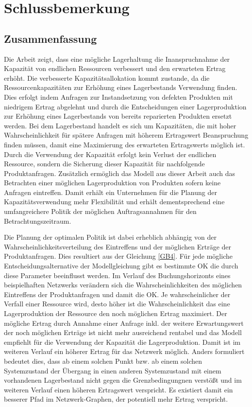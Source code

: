\chapter{Schlussbemerkung}
\setcounter{footnote}{9}

\section*{Zusammenfassung}

Die Arbeit zeigt, dass eine mögliche Lagerhaltung die Inanspruchnahme der Kapazität von endlichen Ressourcen verbessert und den erwarteten Ertrag erhöht. Die verbesserte Kapazitätsallokation kommt zustande, da die Ressourcenkapazitäten zur Erhöhung eines Lagerbestands Verwendung finden. Dies erfolgt indem Anfragen zur Instandsetzung von defekten Produkten mit niedrigem Ertrag abgelehnt und durch die Entscheidungen einer Lagerproduktion zur Erhöhung eines Lagerbestands von bereits reparierten Produkten ersetzt werden. Bei dem Lagerbestand handelt es sich um Kapazitäten, die mit hoher Wahrscheinlichkeit für spätere Anfragen mit höherem Ertragswert Beanspruchung finden müssen, damit eine Maximierung des erwarteten Ertragswerts möglich ist. Durch die Verwendung der Kapazität erfolgt kein Verlust der endlichen Ressource, sondern die Sicherung dieser Kapazität für nachfolgende Produktanfragen. Zusätzlich ermöglich das Modell aus dieser Arbeit auch das Betrachten einer möglichen Lagerproduktion von Produkten sofern keine Anfragen eintreffen. Damit erhält ein Unternehmen für die Planung der Kapazitätsverwendung mehr Flexibilität und erhält dementsprechend eine umfangreichere Politik der möglichen Auftragsannahmen für den Betrachtungszeitraum.

Die Planung der optimalen Politik ist dabei erheblich abhängig von der Wahrscheinlichkeitsverteilung des Eintreffens und der möglichen Erträge der Produktanfragen. Dies resultiert aus der Gleichung \eqref{GB4}. Für jede mögliche Entscheidungsalternative der Modellgleichung gibt es bestimmte OK die durch diese Parameter beeinflusst werden. Im Verlauf des Buchungshorizonts eines beispielhaften Netzwerks verändern sich die Wahrscheinlichkeiten des möglichen Eintreffens der Produktanfragen und damit die OK. Je wahrscheinlicher der Verfall einer Ressource wird, desto höher ist die Wahrscheinlichkeit das eine Lagerproduktion der Ressource den noch möglichen Ertrag maximiert. Der mögliche Ertrag durch Annahme einer Anfrage inkl. der weitere Erwartungswert der noch möglichen Erträge ist nicht mehr ausreichend rentabel und das Modell empfiehlt für die Verwendung der Kapazität die Lagerproduktion. Damit ist im weiteren Verlauf ein höherer Ertrag für das Netzwerk möglich. Anders formuliert bedeutet dies, dass ab einem solchen Punkt bzw. ab einem solchen Systemzustand der Übergang in einen anderen Systemzustand mit einem vorhandenen Lagerbestand nicht gegen die Grenzbedingungnen verstößt und im weiteren Verlauf einen höheren Ertragswert verspricht. Es existiert  damit ein besserer Pfad im Netzwerk-Graphen, der potentiell mehr Ertrag verspricht.

